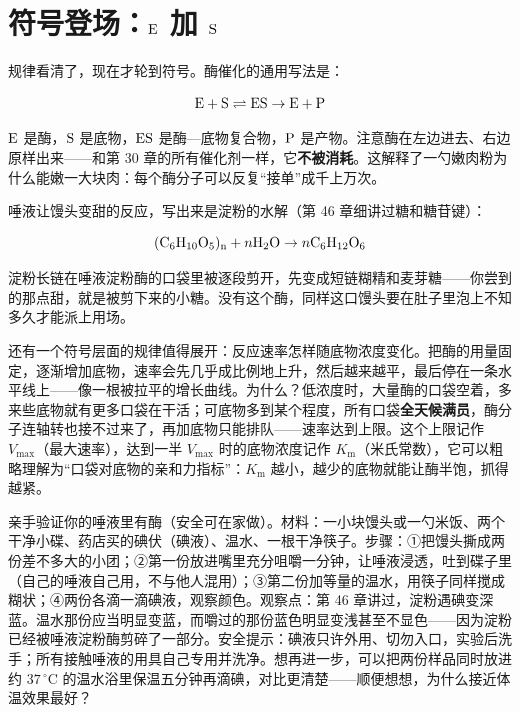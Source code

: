 \section{符号登场：\texorpdfstring{$\mathrm{E}$ 加 $\mathrm{S}$}{E 加 S}}

规律看清了，现在才轮到符号。酶催化的通用写法是：

\[\mathrm{E} + \mathrm{S} \rightleftharpoons \mathrm{ES} \rightarrow \mathrm{E} + \mathrm{P}\]

$\mathrm{E}$ 是酶，$\mathrm{S}$ 是底物，$\mathrm{ES}$ 是酶—底物复合物，$\mathrm{P}$ 是产物。注意酶在左边进去、右边原样出来——和第 30 章的所有催化剂一样，它\textbf{不被消耗}。这解释了一勺嫩肉粉为什么能嫩一大块肉：每个酶分子可以反复“接单”成千上万次。

唾液让馒头变甜的反应，写出来是淀粉的水解（第 46 章细讲过糖和糖苷键）：

\[\mathrm{(C_6H_{10}O_5)_{n}} + n\mathrm{H_2O} \rightarrow n\mathrm{C_6H_{12}O_6}\]

淀粉长链在唾液淀粉酶的口袋里被逐段剪开，先变成短链糊精和麦芽糖——你尝到的那点甜，就是被剪下来的小糖。没有这个酶，同样这口馒头要在肚子里泡上不知多久才能派上用场。

还有一个符号层面的规律值得展开：反应速率怎样随底物浓度变化。把酶的用量固定，逐渐增加底物，速率会先几乎成比例地上升，然后越来越平，最后停在一条水平线上——像一根被拉平的增长曲线。为什么？低浓度时，大量酶的口袋空着，多来些底物就有更多口袋在干活；可底物多到某个程度，所有口袋\textbf{全天候满员}，酶分子连轴转也接不过来了，再加底物只能排队——速率达到上限。这个上限记作 $V_{\max}$（最大速率），达到一半 $V_{\max}$ 时的底物浓度记作 $K_{\mathrm{m}}$（米氏常数），它可以粗略理解为“口袋对底物的亲和力指标”：$K_{\mathrm{m}}$ 越小，越少的底物就能让酶半饱，抓得越紧。

\begin{shiyan}
亲手验证你的唾液里有酶（安全可在家做）。材料：一小块馒头或一勺米饭、两个干净小碟、药店买的碘伏（碘液）、温水、一根干净筷子。步骤：①把馒头撕成两份差不多大的小团；②第一份放进嘴里充分咀嚼一分钟，让唾液浸透，吐到碟子里（自己的唾液自己用，不与他人混用）；③第二份加等量的温水，用筷子同样搅成糊状；④两份各滴一滴碘液，观察颜色。观察点：第 46 章讲过，淀粉遇碘变深蓝。温水那份应当明显变蓝，而嚼过的那份蓝色明显变浅甚至不显色——因为淀粉已经被唾液淀粉酶剪碎了一部分。安全提示：碘液只许外用、切勿入口，实验后洗手；所有接触唾液的用具自己专用并洗净。想再进一步，可以把两份样品同时放进约 $37\,^{\circ}\mathrm{C}$ 的温水浴里保温五分钟再滴碘，对比更清楚——顺便想想，为什么接近体温效果最好？
\end{shiyan}

